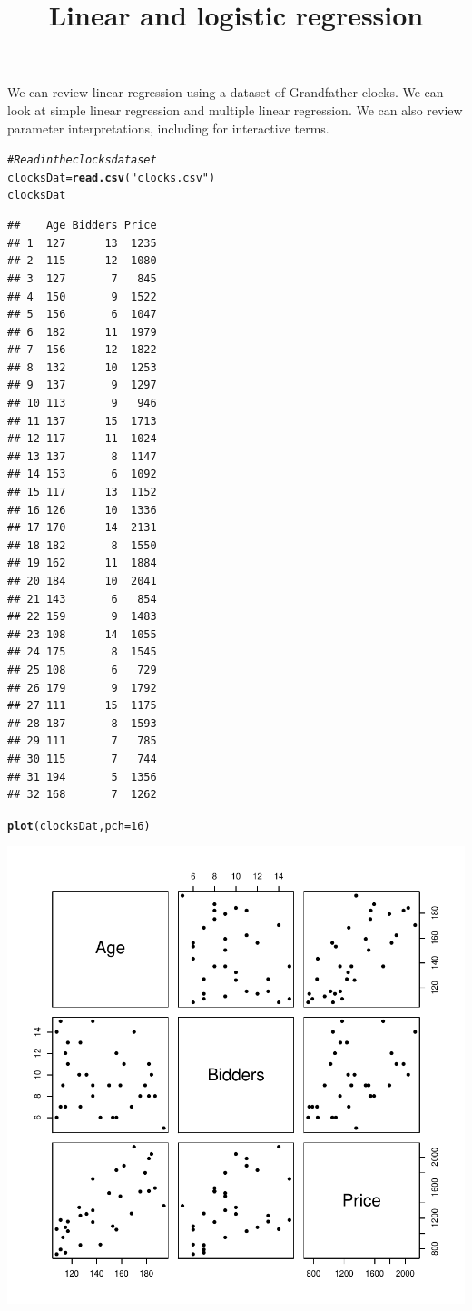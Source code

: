 \documentclass{article}\usepackage[]{graphicx}\usepackage[]{color}
\makeatletter
\newcommand{\hlnum}[1]{\textcolor[rgb]{0.686,0.059,0.569}{#1}}%
\newcommand{\hlstr}[1]{\textcolor[rgb]{0.192,0.494,0.8}{#1}}%
\newcommand{\hlcom}[1]{\textcolor[rgb]{0.678,0.584,0.686}{\textit{#1}}}%
\newcommand{\hlstd}[1]{\textcolor[rgb]{0.345,0.345,0.345}{#1}}%
\newcommand{\hlkwb}[1]{\textcolor[rgb]{0.69,0.353,0.396}{#1}}%
\newcommand{\hlkwc}[1]{\textcolor[rgb]{0.333,0.667,0.333}{#1}}%
\newcommand{\hlkwd}[1]{\textcolor[rgb]{0.737,0.353,0.396}{\textbf{#1}}}%
\newenvironment{kframe}{%
 \def\at@end@of@kframe{}%
 \ifinner\ifhmode%
  \def\at@end@of@kframe{\end{minipage}}%
  \begin{minipage}{\columnwidth}%
 \fi\fi%
 \def\FrameCommand##1{\hskip\@totalleftmargin \hskip-\fboxsep
 \colorbox{shadecolor}{##1}\hskip-\fboxsep
     \hskip-\linewidth \hskip-\@totalleftmargin \hskip\columnwidth}%
 \MakeFramed {\advance\hsize-\width
   \@totalleftmargin\z@ \linewidth\hsize
   \@setminipage}}%
 {\par\unskip\endMakeFramed%
 \at@end@of@kframe}
\newenvironment{knitrout}{}{} %
\makeatother
\begin{document}
\title{Linear and logistic regression}

\maketitle

We can review linear regression using a dataset of Grandfather clocks. We can look at simple linear regression and multiple linear regression. We can also review parameter interpretations, including for interactive terms.

\begin{knitrout}
\color{fgcolor}\begin{kframe}
\begin{alltt}
\hlcom{# Read in the clocks dataset}
\hlstd{clocksDat} \hlkwb{=} \hlkwd{read.csv}\hlstd{(}\hlstr{"clocks.csv"}\hlstd{)}
\hlstd{clocksDat}
\end{alltt}
\begin{verbatim}
##    Age Bidders Price
## 1  127      13  1235
## 2  115      12  1080
## 3  127       7   845
## 4  150       9  1522
## 5  156       6  1047
## 6  182      11  1979
## 7  156      12  1822
## 8  132      10  1253
## 9  137       9  1297
## 10 113       9   946
## 11 137      15  1713
## 12 117      11  1024
## 13 137       8  1147
## 14 153       6  1092
## 15 117      13  1152
## 16 126      10  1336
## 17 170      14  2131
## 18 182       8  1550
## 19 162      11  1884
## 20 184      10  2041
## 21 143       6   854
## 22 159       9  1483
## 23 108      14  1055
## 24 175       8  1545
## 25 108       6   729
## 26 179       9  1792
## 27 111      15  1175
## 28 187       8  1593
## 29 111       7   785
## 30 115       7   744
## 31 194       5  1356
## 32 168       7  1262
\end{verbatim}
\begin{alltt}
\hlkwd{plot}\hlstd{(clocksDat,}\hlkwc{pch}\hlstd{=}\hlnum{16}\hlstd{)}
\end{alltt}
\end{kframe}
\includegraphics[width=.6\linewidth]{figure/unnamed-chunk-1-1} 

\end{knitrout}
\end{document}
